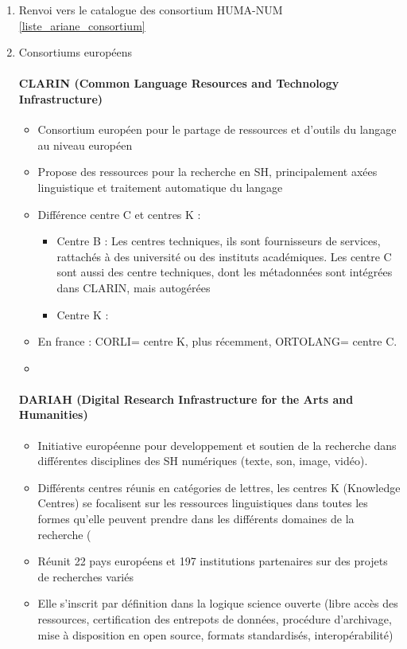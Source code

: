 \documentclass{book}
\newenvironment{titlemize}[1]{%
  \paragraph{#1}
  \begin{itemize}}
  {\end{itemize}}
\begin{document}
\begin{enumerate}
\begin{titlemize}{CORLI 2 (Corpus, Langues et Interactions 2)}
            \item Ressources utiles sur les outils, formats, bonnes pratiques et aspect juridiques
        \end{titlemize}
    \item Renvoi vers le catalogue des consortium HUMA-NUM \ref{liste_ariane_consortium}
    \item Consortiums européens
        \begin{titlemize}{CLARIN (Common Language Resources and Technology Infrastructure)}
            \item Consortium européen pour le partage de ressources et d'outils du langage au niveau européen
            \item Propose des ressources pour la recherche en SH, principalement axées linguistique et traitement automatique du langage
            \item Différence centre C et centres K : 
            \begin{itemize}
                \item Centre B : Les centres techniques, ils sont fournisseurs de services, rattachés à des université ou des instituts académiques. Les centre C sont aussi des centre techniques, dont les métadonnées sont intégrées dans CLARIN, mais autogérées%
                \item Centre K : 
            \end{itemize}
            \item En france : CORLI= centre K, plus récemment, ORTOLANG= centre C.
            \item 
        \end{titlemize}
        \begin{titlemize}{DARIAH (Digital Research Infrastructure for the Arts and Humanities)}
            \item Initiative européenne pour developpement et soutien de la recherche dans différentes disciplines des SH numériques (texte, son, image, vidéo).
            \item Différents centres réunis en catégories de lettres, les centres K (Knowledge Centres) se focalisent sur les ressources linguistiques dans toutes les formes qu'elle peuvent prendre dans les différents domaines de la recherche (
            \item Réunit 22 pays européens et 197 institutions partenaires sur des projets de recherches variés
            \item Elle s'inscrit par définition dans la logique science ouverte (libre accès des ressources, certification des entrepots de données, procédure d'archivage, mise à disposition en open source, formats standardisés, interopérabilité)            
        \end{titlemize}
\end{enumerate}
\end{document}
